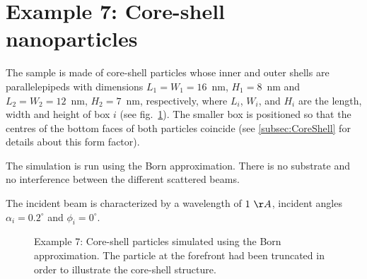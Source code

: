 \newpage
\section{Example 7: Core-shell nanoparticles}
The sample is made of core-shell particles whose inner and outer shells are parallelepipeds with dimensions  $L_1=W_1=16$~nm, $H_1=8$~nm and  $L_2=W_2=12$~nm, $H_2=7$~nm, respectively, where $L_i$, $W_i$, and $H_i$ are the length, width and height of box $i$ (see fig.~\ref{fig:PythonEx7Core}). The smaller box is positioned so that the centres of the bottom faces of both particles coincide (see \ref{subsec:CoreShell} for details about this form factor). 

The simulation is run using the Born approximation. There is no substrate and no interference between the different scattered beams.

The incident beam is characterized by a wavelength of $1~\AA$, incident angles $\alpha_i=0.2^{\circ}$ and $\phi_i=0^{\circ}$.


\begin{figure}[H]
\hfill
{}
\hfill
{}
\hfill
\caption{Example 7: Core-shell particles simulated using the Born approximation. The particle at the forefront had been truncated in order to illustrate the core-shell structure.}
\label{fig:PythonEx7Core}
\end{figure}

